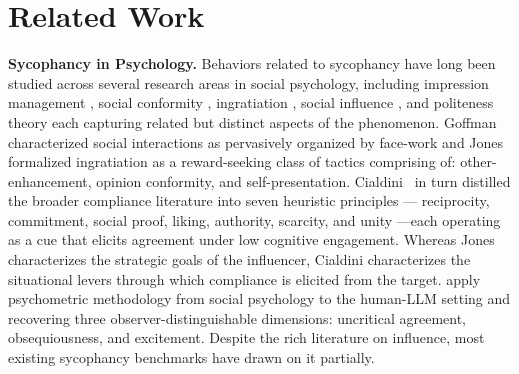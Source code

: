 \section{Related Work}\label{sec:related-work}
\textbf{Sycophancy in Psychology.}
Behaviors related to sycophancy have long been studied across several research areas in social psychology, including impression management \cite{goffman1955facework}, social conformity \cite{asch1956studies}, ingratiation \cite{jones1964ingratiation}, social influence \cite{cialdini1984influence, cialdini2016presuasion}, and politeness theory \cite{brown1978universals, brown1987politeness} each capturing related but distinct aspects of the phenomenon. 
Goffman \cite{goffman1955facework} characterized social interactions as pervasively organized by face-work and Jones \cite{jones1964ingratiation} formalized ingratiation as a reward-seeking class of tactics comprising of: other-enhancement, opinion conformity, and self-presentation. 
Cialdini~\cite{cialdini1984influence, cialdini2016presuasion} in turn distilled the broader compliance literature into seven heuristic principles --- reciprocity, commitment, social proof, liking, authority, scarcity, and unity ---each operating as a cue that elicits agreement under low cognitive engagement. 
Whereas Jones characterizes the strategic goals of the influencer, Cialdini characterizes the situational levers through which compliance is elicited from the target.
\cite{rehani2026} apply psychometric methodology from social psychology to the human-LLM setting and recovering three observer-distinguishable dimensions: uncritical agreement, obsequiousness, and excitement. 
Despite the rich literature on influence, most existing sycophancy benchmarks have drawn on it partially. 

